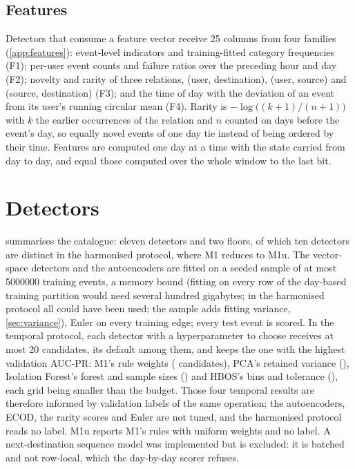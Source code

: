 \documentclass[11pt,a4paper]{article}
\begin{document}
\subsection{Features}
\label{sec:features}
Detectors that consume a feature vector receive 25 columns from four families (\cref{app:features}): event-level indicators and training-fitted category frequencies (F1); per-user event counts and failure ratios over the preceding hour and day (F2); novelty and rarity of three relations, (user, destination), (user, source) and (source, destination) (F3); and the time of day with the deviation of an event from its user's running circular mean (F4). Rarity is $-\log\bigl((k+1)/(n+1)\bigr)$ with $k$ the earlier occurrences of the relation and $n$ counted on days before the event's day, so equally novel events of one day tie instead of being ordered by their time. Features are computed one day at a time with the state carried from day to day, and equal those computed over the whole window to the last bit.

\section{Detectors}
\label{sec:detectors}

 summarises the catalogue: eleven detectors and two floors, of which ten detectors are distinct in the harmonised protocol, where M1 reduces to M1u. The vector-space detectors and the autoencoders are fitted on a seeded sample of at most \num{5000000} training events, a memory bound (fitting on every row of the day-based training partition would need several hundred gigabytes; in the harmonised protocol all \HarmTrainEvents{} could have been used; the sample adds fitting variance, \cref{sec:variance}), Euler on every training edge; every test event is scored. In the temporal protocol, each detector with a hyperparameter to choose receives at most 20 candidates, its default among them, and keeps the one with the highest validation AUC-PR: M1's rule weights (\TuneCountRules{} candidates), PCA's retained variance (\TuneCountPca{}), Isolation Forest's forest and sample sizes (\TuneCountIForest{}) and HBOS's bins and tolerance (\TuneCountHbos{}), each grid being smaller than the budget. Those four temporal results are therefore informed by validation labels of the same operation; the autoencoders, ECOD, the rarity scores and Euler are not tuned, and the harmonised protocol reads no label. M1u reports M1's rules with uniform weights and no label. A next-destination sequence model was implemented but is excluded: it is batched and not row-local, which the day-by-day scorer refuses.
\end{document}

